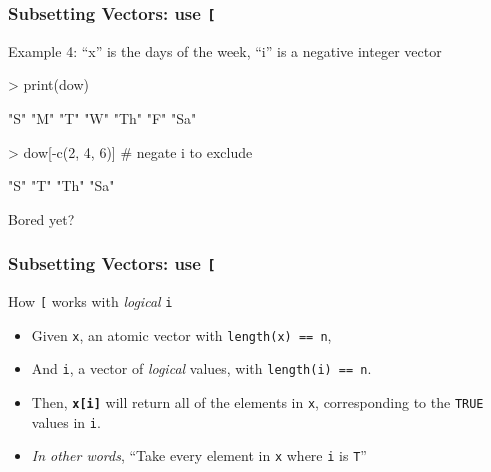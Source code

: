 \documentclass{beamer}
\newcommand{\R}[1]{\texttt{#1}}
\begin{document}
\begin{frame}[fragile]
\frametitle{Subsetting Vectors: use \R{[}}

Example 4: ``x'' is the days of the week, ``i'' is a negative integer vector
\pause
\begin{Schunk}
\begin{Sinput}
> print(dow)
\end{Sinput}
\begin{Soutput}
[1] "S"  "M"  "T"  "W"  "Th" "F"  "Sa"
\end{Soutput}
\end{Schunk}
\pause
\begin{Schunk}
\begin{Sinput}
> dow[-c(2, 4, 6)]  # negate i to exclude
\end{Sinput}
\end{Schunk}
\pause
\begin{Schunk}
\begin{Soutput}
[1] "S"  "T"  "Th" "Sa"
\end{Soutput}
\end{Schunk}
\pause
Bored yet?

\end{frame}



\begin{frame}[fragile]
\frametitle{Subsetting Vectors: use \R{[}}

How \R{[} works with \textit{logical} \R{i}
\begin{itemize}
\item Given \R{x}, an atomic vector with \R{length(x) == n},
\item And \R{i}, a vector of \textit{logical} values, with \R{length(i) == n}.
\item Then, \R{\textbf{x[i]}} will return all of the elements in \R{x}, corresponding to the \R{TRUE} values in \R{i}.
\item \textit{In other words}, ``Take every element in \R{x} where \R{i} is \R{T}''
\end{itemize}

\end{frame}
\end{document}
